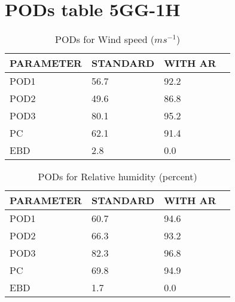 \documentclass[11pt,english]{article}
\begin{document}
\section{PODs table 5GG-1H}
\newpage
\begin{table}[]
\begin{center}
\begin{tabular}{|l|l|l|l|}
\hline
\multicolumn{1}{|c|}{\cellcolor[HTML]{C0C0C0}\textbf{PARAMETER}} & \multicolumn{1}{c|}{\cellcolor[HTML]{C0C0C0}\textbf{STANDARD}} & \multicolumn{1}{c|}{\cellcolor[HTML]{C0C0C0}\textbf{WITH AR}} \\
\hline
\cellcolor[HTML]{C0C0C0}POD1  & 56.7                                & 92.2         \\
\cellcolor[HTML]{C0C0C0}POD2  & 49.6                                & 86.8         \\
\cellcolor[HTML]{C0C0C0}POD3  & 80.1                                & 95.2         \\
\cellcolor[HTML]{C0C0C0}PC    & 62.1                                  & 91.4           \\
\cellcolor[HTML]{C0C0C0}EBD   & 2.8                                 & 0.0          \\
\hline
\end{tabular}
\caption{PODs for Wind speed ($m s^{-1}$)}
\end{center}
\end{table}
\begin{table}[]
\begin{center}
\begin{tabular}{|l|l|l|l|}
\hline
\multicolumn{1}{|c|}{\cellcolor[HTML]{C0C0C0}\textbf{PARAMETER}} & \multicolumn{1}{c|}{\cellcolor[HTML]{C0C0C0}\textbf{STANDARD}} & \multicolumn{1}{c|}{\cellcolor[HTML]{C0C0C0}\textbf{WITH AR}} \\
\hline
\cellcolor[HTML]{C0C0C0}POD1  & 60.7                                & 94.6         \\
\cellcolor[HTML]{C0C0C0}POD2  & 66.3                                & 93.2         \\
\cellcolor[HTML]{C0C0C0}POD3  & 82.3                                & 96.8         \\
\cellcolor[HTML]{C0C0C0}PC    & 69.8                                  & 94.9           \\
\cellcolor[HTML]{C0C0C0}EBD   & 1.7                                 & 0.0          \\
\hline
\end{tabular}
\caption{PODs for Relative humidity (percent)}
\end{center}
\end{table}
\end{document}
